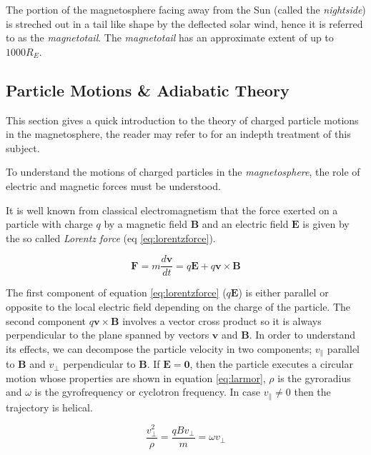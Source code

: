 The portion of the magnetosphere facing away from the Sun (called the \emph{nightside}) is streched out in  
a tail like shape by the deflected solar wind, hence it is referred to as the \emph{magnetotail}. The 
\emph{magnetotail} has an approximate extent of up to $1000R_E$.


\subsection{Particle Motions \& Adiabatic Theory} \label{sec:plasmadiff}

This section gives a quick introduction to the theory of charged particle motions in the magnetosphere, the reader 
may refer to \citet{roederer2012dynamics} for an indepth treatment of this subject.

To understand the motions of charged particles in the \emph{magnetosphere}, the role of electric and magnetic 
forces must be understood.

It is well known from classical electromagnetism that the force exerted on a particle with charge $q$ by a 
magnetic field $\mathbf{B}$ and an electric field $\mathbf{E}$ is given by the so called \emph{Lorentz force} 
(eq \ref{eq:lorentzforce}).

\begin{equation}\label{eq:lorentzforce}
    \mathbf{F} = m\frac{d\mathbf{v}}{dt} = q\mathbf{E} + q\mathbf{v} \times \mathbf{B}
\end{equation}


The first component of equation \ref{eq:lorentzforce} ($q\mathbf{E}$) is either parallel or opposite to the local electric 
field depending on the charge of the particle. The second component $q\mathbf{v} \times \mathbf{B}$ involves a vector 
cross product so it is always perpendicular to the plane spanned by vectors $\mathbf{v}$ and $\mathbf{B}$. In order to 
understand its effects, we can decompose the particle velocity in two components; $v_{\parallel}$ parallel to $\mathbf{B}$ and 
$v_{\perp}$ perpendicular to $\mathbf{B}$. If $\mathbf{E} = \mathbf{0}$, then the particle executes a circular motion 
whose properties are shown in equation \ref{eq:larmor}, $\rho$ is the gyroradius and $\omega$ is the gyrofrequency or 
cyclotron frequency. In case $v_{\parallel} \neq 0$ then the trajectory is helical.

\begin{equation}\label{eq:larmor}
    \frac{v^{2}_{\perp}}{\rho} = \frac{qBv_{\perp}}{m} = \omega v_{\perp}
\end{equation}

